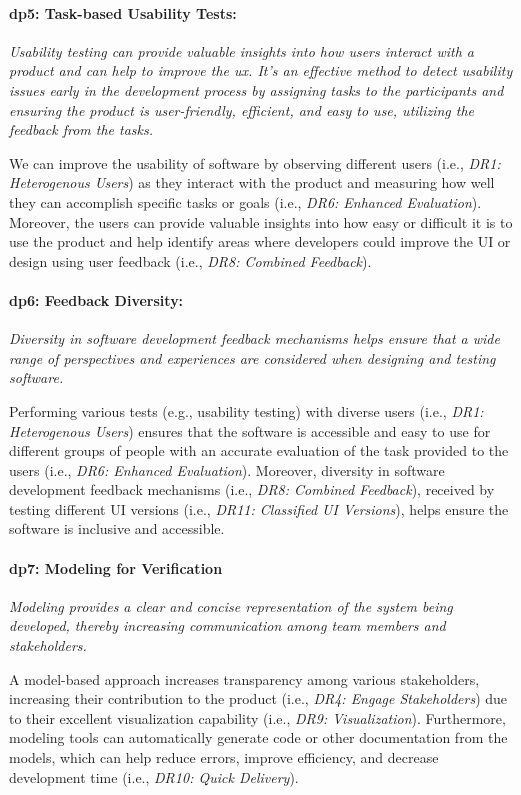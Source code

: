 \paragraph{\ac{dp}5: Task-based Usability Tests:} \textit{Usability testing can provide valuable insights into how users interact with a product and can help to improve the \ac{ux}. It's an effective method to detect usability issues early in the development process by assigning tasks to the participants and ensuring the product is user-friendly, efficient, and easy to use, utilizing the feedback from the tasks.}

We can improve the usability of software by observing different users (i.e., \textit{DR1: Heterogenous Users}) as they interact with the product and measuring how well they can accomplish specific tasks or goals (i.e., \textit{DR6: Enhanced Evaluation}).
Moreover, the users can provide valuable insights into how easy or difficult it is to use the product and help identify areas where developers could improve the UI or design using user feedback (i.e., \textit{DR8: Combined Feedback}). 

\paragraph{\ac{dp}6: Feedback Diversity:} \textit{Diversity in software development feedback mechanisms helps ensure that a wide range of perspectives and experiences are considered when designing and testing software.}

Performing various tests (e.g., usability testing) with diverse users (i.e., \textit{DR1: Heterogenous Users}) ensures that the software is accessible and easy to use for different groups of people with an accurate evaluation of the task provided to the users (i.e., \textit{DR6: Enhanced Evaluation}).
Moreover, diversity in software development feedback mechanisms (i.e., \textit{DR8: Combined Feedback}), received by testing different UI versions (i.e., \textit{DR11: Classified UI Versions}), helps ensure the software is inclusive and accessible.

\paragraph{\ac{dp}7: Modeling for Verification} \textit{Modeling provides a clear and concise representation of the system being developed, thereby increasing communication among team members and stakeholders.}

A model-based approach increases transparency among various stakeholders, increasing their contribution to the product (i.e., \textit{DR4: Engage Stakeholders}) due to their excellent visualization capability (i.e., \textit{DR9: Visualization}).
Furthermore, modeling tools can automatically generate code or other documentation from the models, which can help reduce errors, improve efficiency, and decrease development time (i.e., \textit{DR10: Quick Delivery}).

